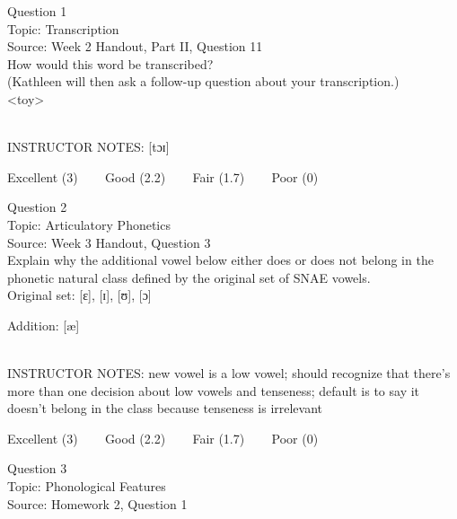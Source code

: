 \documentclass[12pt]{article}
\begin{document}
\begin{center}
\textbf{{\color{blue}{\HUGE START OF EXAM\\}}}

\textbf{{\color{blue}{\HUGE Student ID: 74145\\}}}

\textbf{{\color{blue}{\HUGE \\}}}

\end{center}
\newpage

{\large Question 1}\\

Topic: Transcription\\
Source: Week 2 Handout, Part II, Question 11\\

How would this word be transcribed?\\ (Kathleen will then ask a follow-up question about your transcription.)\\

<toy>


~\\
INSTRUCTOR NOTES: [tɔɪ]


\vfill
Excellent (3) ~~~ Good (2.2) ~~~ Fair (1.7) ~~~ Poor (0)
\newpage

{\large Question 2}\\

Topic: Articulatory Phonetics\\
Source: Week 3 Handout, Question 3\\

Explain why the additional vowel below either does or does not belong in the phonetic natural class defined by the original set of SNAE vowels.\\

Original set: {[ɛ]}, {[ɪ]}, {[ʊ]}, {[ɔ]}

Addition: {[æ]}


~\\
INSTRUCTOR NOTES: new vowel is a low vowel; should recognize that there's more than one decision about low vowels and tenseness; default is to say it doesn't belong in the class because tenseness is irrelevant


\vfill
Excellent (3) ~~~ Good (2.2) ~~~ Fair (1.7) ~~~ Poor (0)
\newpage

{\large Question 3}\\

Topic: Phonological Features\\
Source: Homework 2, Question 1\\
\end{document}
